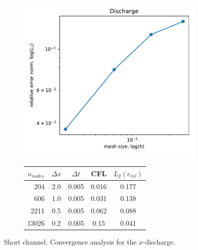 \documentclass[a4paper,12pt]{elsarticle}
\begin{document}
\begin{figure}
\begin{subfigure}{0.4\textwidth}
    \includegraphics[width=\textwidth]{img/jump/momentum_convergence.pdf}    
\end{subfigure}
\hfill
\begin{subfigure}{0.58\textwidth}
    \begin{tabular}{>{\small}rcccc} \hline
    $n_{nodes}$ & $\Delta x$ & $\Delta t$ & CFL   & $L_2(e_{rel})$ \\ \hline
    204         &        2.0 &      0.005 & 0.016 & 0.177 \\
    606         &        1.0 &      0.005 & 0.031 & 0.138 \\
    2211        &        0.5 &      0.005 & 0.062 & 0.088 \\
    13026       &        0.2 &      0.005 & 0.15  & 0.041 \\ \hline
    \end{tabular}
\end{subfigure}
\caption{Short channel. Convergence analysis for the $x$-discharge.}
\label{hydraulic_jump_convergence}
\end{figure}
\end{document}
